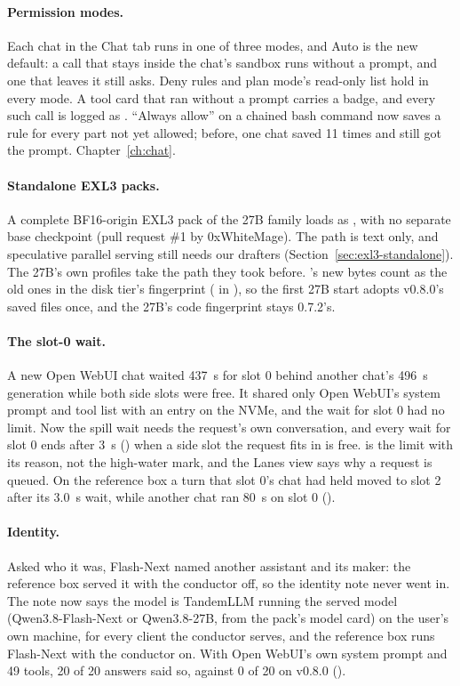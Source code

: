 \paragraph{Permission modes.} Each chat in the Chat tab runs in one of three modes, and Auto is the new default: a call that stays inside the chat's sandbox runs without a prompt, and one that leaves it still asks. Deny rules and plan mode's read-only list hold in every mode. A tool card that ran without a prompt carries a badge, and every such call is logged as . \enquote{Always allow} on a chained bash command now saves a rule for every part not yet allowed; before, one chat saved  11 times and still got the prompt. Chapter~\ref{ch:chat}.

\paragraph{Standalone EXL3 packs.} A complete BF16-origin  EXL3 pack of the 27B family loads as , with no separate base checkpoint (pull request \#1 by 0xWhiteMage). The path is text only, and speculative parallel serving still needs our drafters (Section~\ref{sec:exl3-standalone}). The 27B's own profiles take the path they took before. 's new bytes count as the old ones in the disk tier's fingerprint ( in ), so the first 27B start adopts v0.8.0's saved files once, and the 27B's code fingerprint stays 0.7.2's.

\paragraph{The slot-0 wait.} A new Open WebUI chat waited 437~s for slot 0 behind another chat's 496~s generation while both side slots were free. It shared only Open WebUI's system prompt and tool list with an entry on the NVMe, and the wait for slot 0 had no limit. Now the spill wait needs the request's own conversation, and every wait for slot 0 ends after 3~s () when a side slot the request fits in is free.   is the limit with its reason, not the high-water mark, and the Lanes view says why a request is queued. On the reference box a turn that slot 0's chat had held moved to slot 2 after its 3.0~s wait, while another chat ran 80~s on slot 0 (\measured).

\paragraph{Identity.} Asked who it was, Flash-Next named another assistant and its maker: the reference box served it with the conductor off, so the identity note never went in. The note now says the model is TandemLLM running the served model (Qwen3.8-Flash-Next or Qwen3.8-27B, from the pack's model card) on the user's own machine, for every client the conductor serves, and the reference box runs Flash-Next with the conductor on. With Open WebUI's own system prompt and 49 tools, 20 of 20 answers said so, against 0 of 20 on v0.8.0 (\measured).

